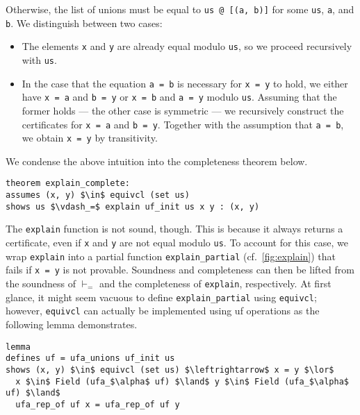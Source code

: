 \documentclass[
  sigplan,
  10pt,
  anonymous,
  review,
  ]{acmart}
\begin{document}
Otherwise, the list of unions must be equal to \lstinline|us @ [(a, b)]| for some \lstinline|us|, \lstinline|a|, and \lstinline|b|.
We distinguish between two cases:
\begin{itemize}
  \item The elements \lstinline|x| and \lstinline|y| are already equal modulo \lstinline|us|, so we proceed recursively with \lstinline|us|.
  \item In the case that the equation \lstinline|a = b| is necessary for \lstinline|x = y| to hold, we either have \lstinline|x = a| and \lstinline|b = y| or \lstinline|x = b| and \lstinline|a = y| modulo \lstinline|us|.
    Assuming that the former holds --- the other case is symmetric --- we recursively construct the certificates for \lstinline|x = a| and \lstinline|b = y|.
    Together with the assumption that \lstinline|a = b|, we obtain \lstinline|x = y| by transitivity.
\end{itemize}

We condense the above intuition into the completeness theorem below.
\begin{lstlisting}
theorem explain_complete:
assumes (x, y) $\in$ equivcl (set us)
shows us $\vdash_=$ explain uf_init us x y : (x, y)
\end{lstlisting}

The \lstinline|explain| function is not sound, though.
This is because it always returns a certificate, even if \lstinline|x| and \lstinline|y| are not equal modulo \lstinline|us|.
To account for this case, we wrap \lstinline|explain| into a partial function \lstinline|explain_partial| (cf.\ \autoref{fig:explain}) that fails if \lstinline|x = y| is not provable.
Soundness and completeness can then be lifted from the soundness of $\vdash_=$ and the completeness of \lstinline|explain|, respectively.
At first glance, it might seem vacuous to define \lstinline|explain_partial| using \lstinline|equivcl|;
however, \lstinline|equivcl| can actually be implemented using \acrshort{uf} operations as the following lemma demonstrates.
\begin{lstlisting}
lemma
defines uf = ufa_unions uf_init us
shows (x, y) $\in$ equivcl (set us) $\leftrightarrow$ x = y $\lor$
  x $\in$ Field (ufa_$\alpha$ uf) $\land$ y $\in$ Field (ufa_$\alpha$ uf) $\land$
  ufa_rep_of uf x = ufa_rep_of uf y
\end{lstlisting}
\end{document}
